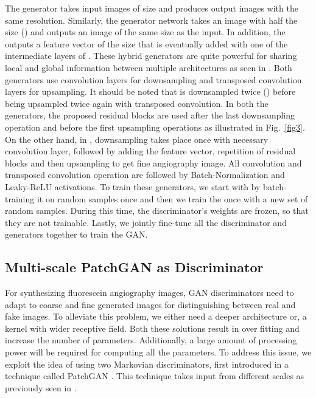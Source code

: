 \documentclass[runningheads]{llncs}
\begin{document}
The generator   takes input images of size  and produces output images with the same resolution. Similarly, the generator  network takes an image with half the size () and  outputs an image of the same size as the input. In addition, the  outputs a feature vector of the size  that is eventually added with one of the intermediate layers of . These hybrid generators are quite powerful for sharing local and global information between multiple architectures as seen in \cite{johnson2016perceptual,shaham2019singan,wang2018high}. Both generators use convolution layers for downsampling and transposed convolution layers for upsampling. It should be noted that  is downsampled twice () before being upsampled twice again with transposed convolution. In both the generators, the proposed residual blocks are used after the last downsampling operation and before the first upsampling operations as illustrated in Fig.~\ref{fig3}. On the other hand, in , downsampling takes place once with necessary convolution layer, followed by adding the feature vector, repetition of residual blocks and then upsampling to get fine angiography image. All convolution and transposed convolution operation are followed by Batch-Normalization and Leaky-ReLU activations. To train these generators, we start with  by batch-training it on random samples once and then we train the  once with a new set of random samples. During this time, the discriminator's weights are frozen, so that they are not trainable. Lastly, we jointly fine-tune  all the discriminator and generators together to train the GAN. 


\subsection{Multi-scale PatchGAN as Discriminator}\label{subsec:discriminators}

For synthesizing fluorescein angiography images, GAN discriminators need to adapt to coarse and fine  generated images for distinguishing between real and fake images. To alleviate this problem, we either need a deeper architecture or, a kernel with wider receptive field. Both these solutions result in over fitting and increase the number of parameters. Additionally, a large amount of processing power will be required for computing all the parameters. To address this issue, we exploit the idea of using two Markovian discriminators, first introduced in a technique called PatchGAN \cite{li2016precomputed}. This technique takes input from different scales as previously seen in \cite{wang2018high,shaham2019singan}. 
\end{document}
